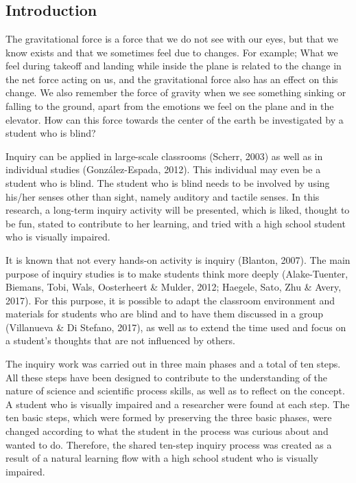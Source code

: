 \documentclass[11.5pt]{sig-alternate}
\begin{document}
\section*{\vspace{140mm}}
\begin{large}

\section*{Introduction}
The gravitational force is a force that we do not see with our eyes, but that we know exists and that we sometimes feel due to changes. For example; What we feel during takeoff and landing while inside the plane is related to the change in the net force acting on us, and the gravitational force also has an effect on this change. We also remember the force of gravity when we see something sinking or falling to the ground, apart from the emotions we feel on the plane and in the elevator. How can this force towards the center of the earth be investigated by a student who is blind?

Inquiry can be applied in large-scale classrooms (Scherr, 2003) as well as in individual studies (González-Espada, 2012). This individual may even be a student who is blind. The student who is blind needs to be involved by using his/her senses other than sight, namely auditory and tactile senses. In this research, a long-term inquiry activity will be presented, which is liked, thought to be fun, stated to contribute to her learning, and tried with a high school student who is visually impaired.

It is known that not every hands-on activity is inquiry (Blanton, 2007). The main purpose of inquiry studies is to make students think more deeply (Alake-Tuenter, Biemans, Tobi, Wals, Oosterheert \& Mulder, 2012; Haegele, Sato, Zhu \& Avery, 2017). For this purpose, it is possible to adapt the classroom environment and materials for students who are blind and to have them discussed in a group (Villanueva \& Di Stefano, 2017), as well as to extend the time used and focus on a student's thoughts that are not influenced by others. 

The inquiry work was carried out in three main phases and a total of ten steps. All these steps have been designed to contribute to the understanding of the nature of science and scientific process skills, as well as to reflect on the concept. A student who is visually impaired and a researcher were found at each step. The ten basic steps, which were formed by preserving the three basic phases, were changed according to what the student in the process was curious about and wanted to do. Therefore, the shared ten-step inquiry process was created as a result of a natural learning flow with a high school student who is visually impaired.


\end{large}
\end{document}
